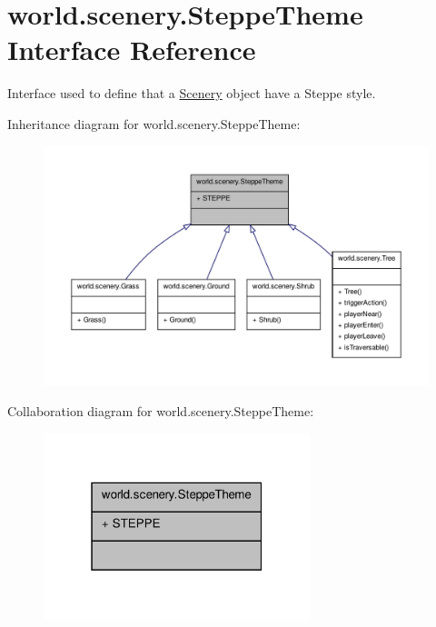 \hypertarget{interfaceworld_1_1scenery_1_1_steppe_theme}{\section{world.\-scenery.\-Steppe\-Theme Interface Reference}
\label{interfaceworld_1_1scenery_1_1_steppe_theme}
}


Interface used to define that a \hyperlink{classworld_1_1scenery_1_1_scenery}{Scenery} object have a Steppe style.  




Inheritance diagram for world.\-scenery.\-Steppe\-Theme\-:\nopagebreak
\begin{figure}[H]
\begin{center}
\leavevmode
\includegraphics[width=350pt]{interfaceworld_1_1scenery_1_1_steppe_theme__inherit__graph}
\end{center}
\end{figure}


Collaboration diagram for world.\-scenery.\-Steppe\-Theme\-:\nopagebreak
\begin{figure}[H]
\begin{center}
\leavevmode
\includegraphics[width=220pt]{interfaceworld_1_1scenery_1_1_steppe_theme__coll__graph}
\end{center}
\end{figure}

